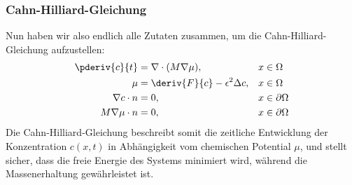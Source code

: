 \subsubsection{Cahn-Hilliard-Gleichung}
Nun haben wir also endlich alle Zutaten zusammen,
um die Cahn-Hilliard-Gleichung aufzustellen:
\begin{align}
\begin{aligned}
\pderiv{c}{t}
&=
\nabla \cdot (M \nabla \mu)
,\quad&
x &\in \Omega
\\
\mu
&=
\deriv{F}{c} -  \epsilon^2 \Delta c
,&
x &\in \Omega
\\
\nabla c \cdot n
&=
0
,&
x &\in \partial\Omega
\\
M \nabla \mu \cdot n
&=
0
,&
x &\in \partial\Omega
\end{aligned}
\label{cahnhilliard:cheq}
\end{align}
Die Cahn-Hilliard-Gleichung beschreibt somit
die zeitliche Entwicklung der Konzentration $c(x,t)$
in Abhängigkeit vom chemischen Potential $\mu$,
und stellt sicher,
dass die freie Energie des Systems minimiert wird,
während die Massenerhaltung gewährleistet ist.
